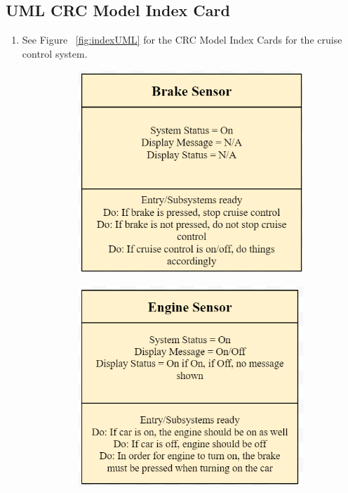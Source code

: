 \documentclass[preprint,11pt,3p]{article}
\begin{document}
\subsection{UML CRC Model Index Card}
\begin{enumerate}
	\item See Figure ~\ref{fig:indexUML} for the CRC Model Index Cards for the cruise control system.
		\begin{figure}[H]
			\begin{subfigure}{.3\textwidth}
				\centering
				\includegraphics[width=.8\linewidth]{images/brakesensorindex.PNG}
				\label{fig:sub1}
			\end{subfigure}
			\begin{subfigure}{.3\textwidth}
				\centering
				\includegraphics[width=.8\linewidth]{images/enginesensorindex.PNG}

\end{subfigure}
\end{figure}
\end{enumerate}
\end{document}
